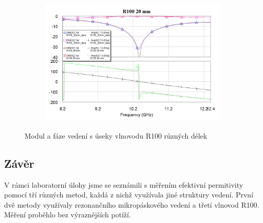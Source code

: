 \documentclass[11pt,a4paper]{article}
\begin{document}
\begin{figure}[!ht]
\begin{subfigure}{0.45\textwidth}
\end{subfigure}
\begin{subfigure}{0.45\textwidth}
    \centering
    \includegraphics[width=\textwidth]{src/r100-20mm.png}
\end{subfigure}
\caption{\label{fig:r100-grafy}Modul a fáze vedení s úseky vlnovodu R100 různých délek}
\end{figure}

\subsection*{Závěr}
V rámci laboratorní úlohy jsme se seznámili s měřením efektivní permitivity pomocí tří různých metod, každá z nichž využívala jiné struktury vedení. První dvě metody využívaly rezonančního mikropáskového vedení a třetí vlnovod R100.  Měření proběhlo bez výraznějších potíží.
\end{document}
